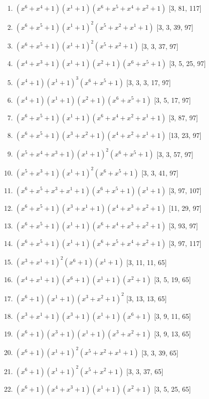 \documentclass[10pt,twocolumn]{article}
\begin{document}
\begin{enumerate}
\item $(x^{6} + x^{4} + 1)(x^{1} + 1)(x^{6} + x^{5} + x^{4} + x^{2} + 1)$  [3, 81, 117]
\item $(x^{6} + x^{5} + 1)(x^{1} + 1)^{2}(x^{5} + x^{2} + x^{1} + 1)$  [3, 3, 39, 97]
\item $(x^{6} + x^{5} + 1)(x^{1} + 1)^{2}(x^{5} + x^{2} + 1)$  [3, 3, 37, 97]
\item $(x^{4} + x^{3} + 1)(x^{1} + 1)(x^{2} + 1)(x^{6} + x^{5} + 1)$  [3, 5, 25, 97]
\item $(x^{4} + 1)(x^{1} + 1)^{3}(x^{6} + x^{5} + 1)$  [3, 3, 3, 17, 97]
\item $(x^{4} + 1)(x^{1} + 1)(x^{2} + 1)(x^{6} + x^{5} + 1)$  [3, 5, 17, 97]
\item $(x^{6} + x^{5} + 1)(x^{1} + 1)(x^{6} + x^{4} + x^{2} + x^{1} + 1)$  [3, 87, 97]
\item $(x^{6} + x^{5} + 1)(x^{3} + x^{2} + 1)(x^{4} + x^{2} + x^{1} + 1)$  [13, 23, 97]
\item $(x^{5} + x^{4} + x^{3} + 1)(x^{1} + 1)^{2}(x^{6} + x^{5} + 1)$  [3, 3, 57, 97]
\item $(x^{5} + x^{3} + 1)(x^{1} + 1)^{2}(x^{6} + x^{5} + 1)$  [3, 3, 41, 97]
\item $(x^{6} + x^{5} + x^{3} + x^{1} + 1)(x^{6} + x^{5} + 1)(x^{1} + 1)$  [3, 97, 107]
\item $(x^{6} + x^{5} + 1)(x^{3} + x^{1} + 1)(x^{4} + x^{3} + x^{2} + 1)$  [11, 29, 97]
\item $(x^{6} + x^{5} + 1)(x^{1} + 1)(x^{6} + x^{4} + x^{3} + x^{2} + 1)$  [3, 93, 97]
\item $(x^{6} + x^{5} + 1)(x^{1} + 1)(x^{6} + x^{5} + x^{4} + x^{2} + 1)$  [3, 97, 117]
\item $(x^{3} + x^{1} + 1)^{2}(x^{6} + 1)(x^{1} + 1)$  [3, 11, 11, 65]
\item $(x^{4} + x^{1} + 1)(x^{6} + 1)(x^{1} + 1)(x^{2} + 1)$  [3, 5, 19, 65]
\item $(x^{6} + 1)(x^{1} + 1)(x^{3} + x^{2} + 1)^{2}$  [3, 13, 13, 65]
\item $(x^{3} + x^{1} + 1)(x^{3} + 1)(x^{1} + 1)(x^{6} + 1)$  [3, 9, 11, 65]
\item $(x^{6} + 1)(x^{3} + 1)(x^{1} + 1)(x^{3} + x^{2} + 1)$  [3, 9, 13, 65]
\item $(x^{6} + 1)(x^{1} + 1)^{2}(x^{5} + x^{2} + x^{1} + 1)$  [3, 3, 39, 65]
\item $(x^{6} + 1)(x^{1} + 1)^{2}(x^{5} + x^{2} + 1)$  [3, 3, 37, 65]
\item $(x^{6} + 1)(x^{4} + x^{3} + 1)(x^{1} + 1)(x^{2} + 1)$  [3, 5, 25, 65]

\end{enumerate}
\end{document}
